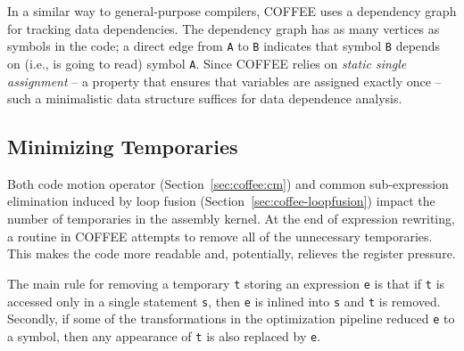 In a similar way to general-purpose compilers, COFFEE uses a dependency graph for tracking data dependencies. The dependency graph has as many vertices as symbols in the code; a direct edge from \texttt{A} to \texttt{B} indicates that symbol \texttt{B} depends on (i.e., is going to read) symbol \texttt{A}. Since COFFEE relies on \textit{static single assignment} -- a property that ensures that variables are assigned exactly once -- such a minimalistic data structure suffices for data dependence analysis.

\subsection{Minimizing Temporaries}
Both code motion operator (Section~\ref{sec:coffee:cm}) and common sub-expression elimination induced by loop fusion (Section~\ref{sec:coffee-loopfusion}) impact the number of temporaries in the assembly kernel. At the end of expression rewriting, a routine in COFFEE attempts to remove all of the unnecessary temporaries. This makes the code more readable and, potentially, relieves the register pressure.

The main rule for removing a temporary \texttt{t} storing an expression \texttt{e} is that if \texttt{t} is accessed only in a single statement \texttt{s}, then \texttt{e} is inlined into \texttt{s} and \texttt{t} is removed. Secondly, if some of the transformations in the optimization pipeline reduced \texttt{e} to a symbol, then any appearance of \texttt{t} is also replaced by \texttt{e}.